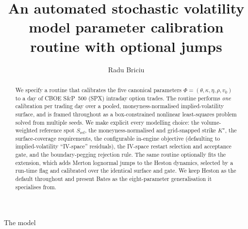 \documentclass[a4paper, 11pt, reqno]{amsart}
\author[R. Briciu]{Radu Briciu}
\title[Stochastic volatility parameter calibration with optional jumps]{An automated stochastic volatility model parameter calibration routine with optional jumps}
\makeatletter
\def\section{\@startsection{section}{1}%
	\z@{.7\linespacing\@plus\linespacing}{.5\linespacing}%
	{\normalfont\bfseries\centering}}
\makeatother
\begin{document}
	\begin{titlepage}
		\vfill
		\begin{abstract}
			\noindent We specify a routine that calibrates the five canonical \textcite{heston1993}
			parameters $\Phi=(\theta,\kappa,\eta,\rho,v_0)$ to a day of CBOE S\&P~500
			(SPX) intraday option trades. The routine performs \emph{one} calibration per
			trading day over a pooled, moneyness-normalised implied-volatility surface,
			and is framed throughout as a box-constrained nonlinear least-squares problem
			solved from multiple seeds. We make explicit every modelling choice: the
			volume-weighted reference spot $S_{\mathrm{ref}}$, the moneyness-normalised and
			grid-snapped strike $K^\star$, the surface-coverage requirements, the configurable
			in-engine objective (defaulting to implied-volatility ``IV-space'' residuals), the
			IV-space restart selection and acceptance gate, and the boundary-pegging rejection rule.
			The same routine optionally fits the \textcite{bates1996} extension, which adds Merton lognormal
			jumps to the Heston dynamics, selected by a run-time flag and calibrated over the identical
			surface and gate. We keep Heston as the default throughout and present Bates as the
			eight-parameter generalisation it specialises from.
		\end{abstract}
		\vfill
		\maketitle
		\vfill
		{\small \tableofcontents}
		\vfill
	\end{titlepage}
	
	
	\section{The model}\label{sec:model}
\end{document}

